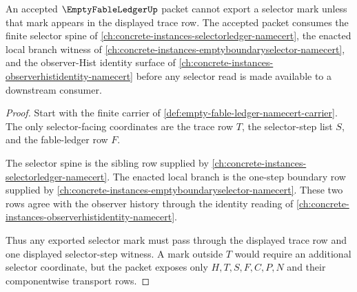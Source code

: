 \begin{theorem}
\label{thm:empty-fable-ledger-namecert-selector-nonescape}
An accepted $\EmptyFableLedgerUp$ packet cannot export a selector mark unless that mark appears in the displayed trace row. The accepted packet consumes the finite selector spine of \autoref{ch:concrete-instances-selectorledger-namecert}, the enacted local branch witness of \autoref{ch:concrete-instances-emptyboundaryselector-namecert}, and the observer-Hist identity surface of \autoref{ch:concrete-instances-observerhistidentity-namecert} before any selector read is made available to a downstream consumer.
\end{theorem}
\begin{proof}
Start with the finite carrier of \autoref{def:empty-fable-ledger-namecert-carrier}. The only selector-facing coordinates are the trace row $T$, the selector-step list $S$, and the fable-ledger row $F$.

The selector spine is the sibling row supplied by \autoref{ch:concrete-instances-selectorledger-namecert}. The enacted local branch is the one-step boundary row supplied by \autoref{ch:concrete-instances-emptyboundaryselector-namecert}. These two rows agree with the observer history through the identity reading of \autoref{ch:concrete-instances-observerhistidentity-namecert}.

Thus any exported selector mark must pass through the displayed trace row and one displayed selector-step witness. A mark outside $T$ would require an additional selector coordinate, but the packet exposes only $H,T,S,F,C,P,N$ and their componentwise transport rows.
\end{proof}

